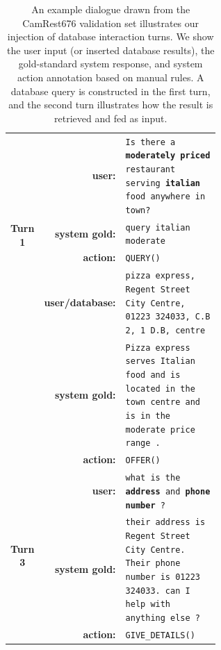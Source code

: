 \begin{table}[tp]
    \centering\scriptsize
    \begin{tabular}{crp{0.6\linewidth}}
        \toprule
         \multirow{4}{*}{\bf Turn 1}&\bf user:& \texttt{Is there a \textbf{moderately priced} restaurant serving \textbf{italian} food anywhere in town?} \\
         &\bf system gold: & \texttt{query italian moderate} \\
         &\bf action: & \texttt{QUERY()} \\
         \midrule
        \multirow{4}{*}{\bf Turn 2}&\bf user/database:& \texttt{pizza express, Regent Street City Centre, 01223 324033, C.B 2, 1 D.B, centre}  \\
         &\bf system gold:& \texttt{Pizza express serves Italian food and is located in the town centre and is in the moderate price range .} \\        
        &\bf action: & \texttt{OFFER()} \\
         \midrule
        \multirow{4}{*}{\bf Turn 3}&\bf user:& \texttt{what is the \textbf{address} and \textbf{phone number} ?} \\
        &\bf system gold:& \texttt{their address is  Regent Street City Centre. Their phone number is 01223 324033. can I help with anything else ?} \\
         &\bf action: & \texttt{GIVE\_DETAILS()} \\
        \bottomrule
    \end{tabular}
    \vspace{-2mm}
    \caption{An example dialogue drawn from the CamRest676 validation set illustrates our injection of database interaction turns. We show the user input (or inserted database results), the gold-standard system response, and system action annotation based on manual rules. A database query is constructed in the first turn, and the second turn illustrates how the result is retrieved and fed as input.}
    \label{05:tab:example}
\end{table}


